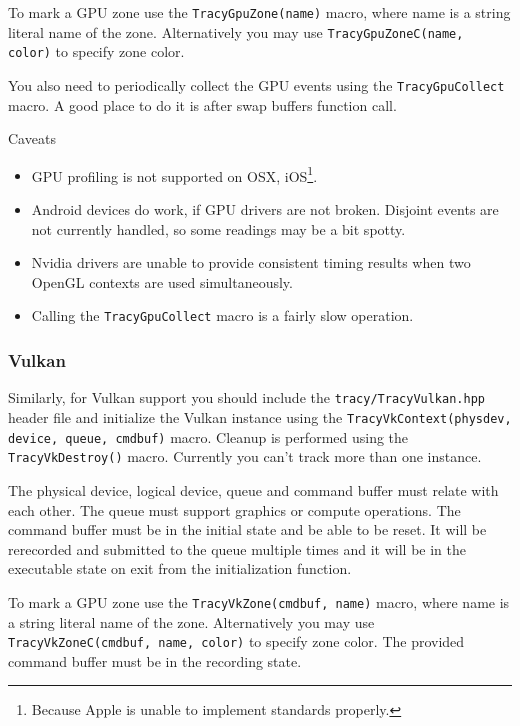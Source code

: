\documentclass[hidelinks,titlepage,a4paper]{article}
\begin{document}
To mark a GPU zone use the \texttt{TracyGpuZone(name)} macro, where name is a string literal name of the zone. Alternatively you may use \texttt{TracyGpuZoneC(name, color)} to specify zone color.

You also need to periodically collect the GPU events using the \texttt{TracyGpuCollect} macro. A good place to do it is after swap buffers function call.

\begin{bclogo}[
noborder=true,
couleur=black!5,
logo=\bcattention
]{Caveats}
\begin{itemize}
\item GPU profiling is not supported on OSX, iOS\footnote{Because Apple is unable to implement standards properly.}.
\item Android devices do work, if GPU drivers are not broken. Disjoint events are not currently handled, so some readings may be a bit spotty.
\item Nvidia drivers are unable to provide consistent timing results when two OpenGL contexts are used simultaneously.
\item Calling the \texttt{TracyGpuCollect} macro is a fairly slow operation.
\end{itemize}
\end{bclogo}

\subsubsection{Vulkan}

Similarly, for Vulkan support you should include the \texttt{tracy/TracyVulkan.hpp} header file and initialize the Vulkan instance using the \texttt{TracyVkContext(physdev, device, queue, cmdbuf)} macro. Cleanup is performed using the \texttt{TracyVkDestroy()} macro. Currently you can't track more than one instance.

The physical device, logical device, queue and command buffer must relate with each other. The queue must support graphics or compute operations. The command buffer must be in the initial state and be able to be reset. It will be rerecorded and submitted to the queue multiple times and it will be in the executable state on exit from the initialization function.

To mark a GPU zone use the \texttt{TracyVkZone(cmdbuf, name)} macro, where name is a string literal name of the zone. Alternatively you may use \texttt{TracyVkZoneC(cmdbuf, name, color)} to specify zone color. The provided command buffer must be in the recording state.
\end{document}
